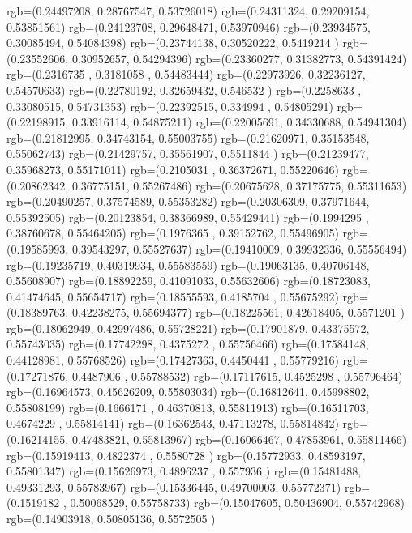 {{{			rgb=(0.24497208,  0.28767547,  0.53726018)
			rgb=(0.24311324,  0.29209154,  0.53851561)
			rgb=(0.24123708,  0.29648471,  0.53970946)
			rgb=(0.23934575,  0.30085494,  0.54084398)
			rgb=(0.23744138,  0.30520222,  0.5419214 )
			rgb=(0.23552606,  0.30952657,  0.54294396)
			rgb=(0.23360277,  0.31382773,  0.54391424)
			rgb=(0.2316735 ,  0.3181058 ,  0.54483444)
			rgb=(0.22973926,  0.32236127,  0.54570633)
			rgb=(0.22780192,  0.32659432,  0.546532  )
			rgb=(0.2258633 ,  0.33080515,  0.54731353)
			rgb=(0.22392515,  0.334994  ,  0.54805291)
			rgb=(0.22198915,  0.33916114,  0.54875211)
			rgb=(0.22005691,  0.34330688,  0.54941304)
			rgb=(0.21812995,  0.34743154,  0.55003755)
			rgb=(0.21620971,  0.35153548,  0.55062743)
			rgb=(0.21429757,  0.35561907,  0.5511844 )
			rgb=(0.21239477,  0.35968273,  0.55171011)
			rgb=(0.2105031 ,  0.36372671,  0.55220646)
			rgb=(0.20862342,  0.36775151,  0.55267486)
			rgb=(0.20675628,  0.37175775,  0.55311653)
			rgb=(0.20490257,  0.37574589,  0.55353282)
			rgb=(0.20306309,  0.37971644,  0.55392505)
			rgb=(0.20123854,  0.38366989,  0.55429441)
			rgb=(0.1994295 ,  0.38760678,  0.55464205)
			rgb=(0.1976365 ,  0.39152762,  0.55496905)
			rgb=(0.19585993,  0.39543297,  0.55527637)
			rgb=(0.19410009,  0.39932336,  0.55556494)
			rgb=(0.19235719,  0.40319934,  0.55583559)
			rgb=(0.19063135,  0.40706148,  0.55608907)
			rgb=(0.18892259,  0.41091033,  0.55632606)
			rgb=(0.18723083,  0.41474645,  0.55654717)
			rgb=(0.18555593,  0.4185704 ,  0.55675292)
			rgb=(0.18389763,  0.42238275,  0.55694377)
			rgb=(0.18225561,  0.42618405,  0.5571201 )
			rgb=(0.18062949,  0.42997486,  0.55728221)
			rgb=(0.17901879,  0.43375572,  0.55743035)
			rgb=(0.17742298,  0.4375272 ,  0.55756466)
			rgb=(0.17584148,  0.44128981,  0.55768526)
			rgb=(0.17427363,  0.4450441 ,  0.55779216)
			rgb=(0.17271876,  0.4487906 ,  0.55788532)
			rgb=(0.17117615,  0.4525298 ,  0.55796464)
			rgb=(0.16964573,  0.45626209,  0.55803034)
			rgb=(0.16812641,  0.45998802,  0.55808199)
			rgb=(0.1666171 ,  0.46370813,  0.55811913)
			rgb=(0.16511703,  0.4674229 ,  0.55814141)
			rgb=(0.16362543,  0.47113278,  0.55814842)
			rgb=(0.16214155,  0.47483821,  0.55813967)
			rgb=(0.16066467,  0.47853961,  0.55811466)
			rgb=(0.15919413,  0.4822374 ,  0.5580728 )
			rgb=(0.15772933,  0.48593197,  0.55801347)
			rgb=(0.15626973,  0.4896237 ,  0.557936  )
			rgb=(0.15481488,  0.49331293,  0.55783967)
			rgb=(0.15336445,  0.49700003,  0.55772371)
			rgb=(0.1519182 ,  0.50068529,  0.55758733)
			rgb=(0.15047605,  0.50436904,  0.55742968)
			rgb=(0.14903918,  0.50805136,  0.5572505 )
}}}

